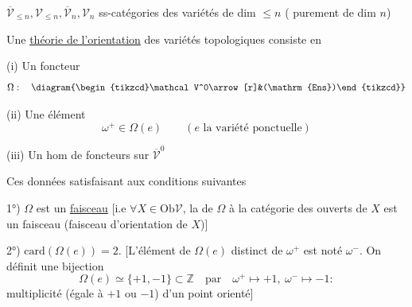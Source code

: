 $\overline{\mathcal V}_{\le n},\mathcal V_{\le n},\overline{\mathcal V}_n,\mathcal V_n$ ss-catégories des variétés de dim $\le n$ ( purement de dim $n$)

Une \uline{théorie de l'orientation} des variétés topologiques consiste en

(i) Un foncteur
\[
\Omega:\quad\diagram{\begin{tikzcd}\mathcal V^0\arrow[r]&(\mathrm{Ens})\end{tikzcd}}
\]

(ii) Une  élément 
\[
\omega^+\in\Omega(e)\qquad(e\text{ la variété ponctuelle})
\]

(iii)  Un hom de foncteurs sur $\overline{\mathcal V}^{0}$

Ces données satisfaisant aux conditions suivantes

1°) $\Omega$ est un \uline{faisceau} [i.e $\forall X\in\mathrm{Ob}\mathcal V$, la   de $\Omega$ à la catégorie des ouverts de $X$ est un faisceau (faisceau d'orientation de $X$)]

2°) $\mathrm{card}(\Omega(e))=2$. [L'élément de $\Omega(e)$ distinct de $\omega^+$ est noté $\omega^-$. On définit une bijection
\[
\Omega(e)\simeq\{+1,-1\}\subset\mathbb Z\quad\text{par}\quad\omega^+\mapsto+1,\ \omega^-\mapsto-1:
\]
multiplicité (égale à $+1$ ou $-1$) d'un point orienté]


